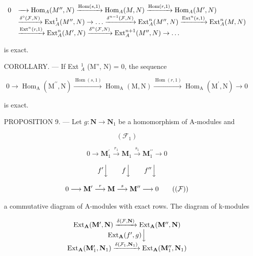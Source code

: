 \[
\begin{array}{r l} 0 & \xrightarrow {\quad} \operatorname{Hom} _ {A} (M ^ {\prime \prime}, N) \xrightarrow {\operatorname{Hom} (s , 1)} \operatorname{Hom} _ {A} (M, N) \xrightarrow {\operatorname{Hom} (r , 1)} \operatorname{Hom} _ {A} (M ^ {\prime}, N) \\ & \xrightarrow {\delta^ {\circ} (\mathcal {F} , N)} \operatorname{Ext} _ {A} ^ {1} (M ^ {\prime \prime}, N) \to \dots \xrightarrow {\delta^ {n - 1} (\mathcal {F} , N)} \operatorname{Ext} _ {A} ^ {n} (M ^ {\prime \prime}, N) \xrightarrow {\operatorname{Ext} ^ {n} (s , 1)} \operatorname{Ext} _ {A} ^ {n} (M, N) \\ & \xrightarrow {\operatorname{Ext} ^ {n} (r , 1)} \operatorname{Ext} _ {A} ^ {n} (M ^ {\prime}, N) \xrightarrow {\delta^ {n} (\mathcal {F} , N)} \operatorname{Ext} _ {A} ^ {n + 1} (M ^ {\prime \prime}, N) \to \dots \end{array}
\]

is exact.

COROLLARY. --- If Ext \(_{A}^{1}\) (M'', N) = 0, the sequence

\[
0 \longrightarrow \operatorname{Hom} _ {\mathrm{A}} \left(\mathrm{M} ^ {\prime \prime}, \mathrm{N}\right) \xrightarrow {\operatorname{Hom} (s , 1)} \operatorname{Hom} _ {\mathrm{A}} (\mathrm{M}, \mathrm{N}) \xrightarrow {\operatorname{Hom} (r , 1)} \operatorname{Hom} _ {\mathrm{A}} \left(\mathrm{M} ^ {\prime}, \mathrm{N}\right) \longrightarrow 0
\]

is exact.

PROPOSITION 9. --- Let \(g: \mathbf{N} \to \mathbf{N}_1\) be a homomorphism of A-modules and

\[
(\mathcal {F} _ {1})
\]

\[
0 \longrightarrow \mathbf {M} _ {1} ^ {\prime} \xrightarrow {r _ {1}} \mathbf {M} _ {1} \xrightarrow {s _ {1}} \mathbf {M} _ {1} ^ {\prime \prime} \longrightarrow 0
\]

\[
f ^ {\prime} \Big \downarrow \qquad f \Big \downarrow \qquad f ^ {\prime \prime} \Big \downarrow
\]

\[
0 \longrightarrow \mathbf {M} ^ {\prime} \stackrel {r} {\longrightarrow} \mathbf {M} \stackrel {s} {\longrightarrow} \mathbf {M} ^ {\prime \prime} \longrightarrow 0\tag{$(\mathcal{F})$}
\]

a commutative diagram of A-modules with exact rows. The diagram of k-modules

\[
\begin{array}{c} \operatorname{Ext} _ {\mathbf {A}} (\mathbf {M} ^ {\prime}, \mathbf {N}) \xrightarrow {\delta (\mathcal {F} , \mathbf {N})} \operatorname{Ext} _ {\mathbf {A}} (\mathbf {M} ^ {\prime \prime}, \mathbf {N}) \\ \operatorname{Ext} _ {\mathbf {A}} (f ^ {\prime}, g) \Big \downarrow \\ \operatorname{Ext} _ {\mathbf {A}} (\mathbf {M} _ {1} ^ {\prime}, \mathbf {N} _ {1}) \xrightarrow {\delta (\mathcal {F} _ {1} , \mathbf {N} _ {1})} \operatorname{Ext} _ {\mathbf {A}} (\mathbf {M} _ {1} ^ {\prime \prime}, \mathbf {N} _ {1}) \end{array}
\]

